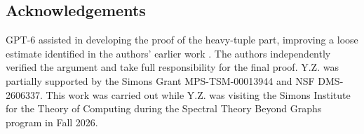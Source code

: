 \documentclass[11pt,reqno]{amsart}
\numberwithin{equation}{section}
\theoremstyle{definition}
\theoremstyle{remark}
\begin{document}
\subsection*{Acknowledgements}

GPT-6 assisted in developing the proof of the heavy-tuple part, improving a loose estimate identified in the authors' earlier work \cite{ZZ21}. The authors independently verified the
argument and take full responsibility for the final proof. Y.Z. was partially supported by the Simons Grant MPS-TSM-00013944 and NSF DMS-2606337. This work was carried out while Y.Z. was visiting the Simons Institute for the Theory of Computing during the Spectral Theory Beyond Graphs program in Fall 2026. 



\end{document}
